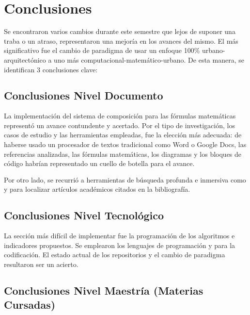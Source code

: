 
\section{Conclusiones}
\label{sec:conclusiones}

Se encontraron varios cambios durante este semestre que lejos de suponer una traba o un atraso, 
representaron una mejoría en los avances del mismo. El más significativo fue el cambio de 
paradigma de usar un enfoque 100\% urbano-arquitectónico a uno más 
computacional-matemático-urbano. De esta manera, se identifican 3 conclusiones clave:

\subsection{Conclusiones Nivel Documento}
\label{ssec:conclusiones-documento}

La implementación del sistema de composición  para las fórmulas matemáticas
representó un avance contundente y acertado. Por el tipo de investigación, los casos de estudio y
las herramientas empleadas, fue la elección más adecuada: de haberse usado un procesador de textos
tradicional como Word o Google Docs, las referencias analizadas, las fórmulas matemáticas,
los diagramas y los bloques de código habrían representado un cuello de botella para el avance.

Por otro lado, se recurrió a herramientas de búsqueda profunda e inmersiva como 
y  para localizar artículos académicos citados en la bibliografía.

\subsection{Conclusiones Nivel Tecnológico}
\label{ssec:conclusiones-tecnologico}

La sección más difícil de implementar fue la programación de los algoritmos e indicadores
propuestos. Se emplearon los lenguajes de programación  y 
para la codificación. El estado actual de los repositorios y el cambio de paradigma resultaron
ser un acierto.

\subsection{Conclusiones Nivel Maestría (Materias Cursadas)}
\label{ssec:conclusiones-nivel-maestría}


